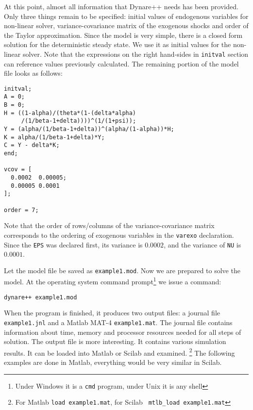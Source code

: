 \documentclass[10pt]{article}
\begin{document}
At this point, almost all information that Dynare++ needs has been
provided. Only three things remain to be specified: initial values of
endogenous variables for non-linear solver, variance-covariance matrix
of the exogenous shocks and order of the Taylor approximation. Since
the model is very simple, there is a closed form solution for the
deterministic steady state. We use it as initial values for the
non-linear solver. Note that the expressions on the right hand-sides in
{\tt initval} section can reference values previously calculated. The
remaining portion of the model file looks as follows:

{\small
\begin{verbatim}
initval;
A = 0;
B = 0;
H = ((1-alpha)/(theta*(1-(delta*alpha)
     /(1/beta-1+delta))))^(1/(1+psi));
Y = (alpha/(1/beta-1+delta))^(alpha/(1-alpha))*H;
K = alpha/(1/beta-1+delta)*Y;
C = Y - delta*K;
end;

vcov = [
  0.0002  0.00005;
  0.00005 0.0001
];

order = 7;
\end{verbatim}
}

Note that the order of rows/columns of the variance-covariance matrix
corresponds to the ordering of exogenous variables in the {\tt varexo}
declaration. Since the {\tt EPS} was declared first, its variance is
$0.0002$, and the variance of {\tt NU} is $0.0001$.

Let the model file be saved as {\tt example1.mod}. Now we are prepared
to solve the model. At the operating system command
prompt\footnote{Under Windows it is a {\tt cmd} program, under Unix it
is any shell} we issue a command:

{\small
\begin{verbatim}
dynare++ example1.mod
\end{verbatim}
}

When the program is finished, it produces two output files: a journal
file {\tt example1.jnl} and a Matlab MAT-4 {\tt example1.mat}. The
journal file contains information about time, memory and processor
resources needed for all steps of solution. The output file is more
interesting. It contains various simulation results. It can be loaded
into Matlab or Scilab and examined.%
\footnote{For Matlab {\tt load example1.mat}, for Scilab {\tt
mtlb\_load example1.mat}} The following examples are done in Matlab,
everything would be very similar in Scilab.
\end{document}

